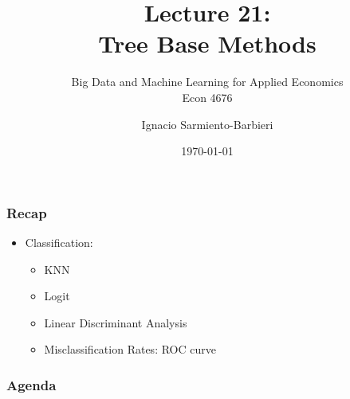 \documentclass[
  shownotes,
  xcolor={svgnames},
  hyperref={colorlinks,citecolor=DarkBlue,linkcolor=DarkRed,urlcolor=DarkBlue}
  ]{beamer}
\begin{document}
\title[Lecture 21]{Lecture 21: \\ Tree Base Methods}
\subtitle{Big Data and Machine Learning for Applied Economics \\ Econ 4676}
\date{\today}

\author[Sarmiento-Barbieri]{Ignacio Sarmiento-Barbieri}


\begin{frame}[noframenumbering]
\maketitle
\end{frame}



\begin{frame}
\frametitle{Recap}

\begin{itemize} 
     \item Classification:
    \medskip
    \begin{itemize} 
      \item KNN
      \medskip   
      \item Logit
      \medskip
      \item Linear Discriminant Analysis
      \medskip
      \item  Misclassification Rates: ROC curve
    \end{itemize}
\end{itemize}
  
\end{frame}


\begin{frame}
\frametitle{Agenda}

\tableofcontents

\end{frame}

\end{document}
